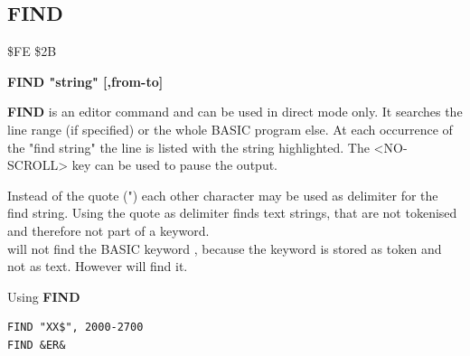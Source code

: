 \subsection{FIND}
\begin{description}[leftmargin=2cm,style=nextline]
\item [Token:] \$FE \$2B
\item [Format:] {\bf FIND "string" [,from-to]}
\item [Usage:]  {\bf FIND} is an editor command and can be used
                in direct mode only. It searches the line range
                (if specified) or the whole BASIC program else.
                At each occurrence of the "find string" the line is
                listed with the string highlighted.
                The <NO-SCROLL> key can be used to pause the output.

\item [Remarks:] Instead of the quote (") each other character may be used
                 as delimiter for the find string.
                 Using the quote as delimiter finds text strings, that are
                 not tokenised and therefore not part of a keyword. \\
                  will not find
                 the BASIC keyword , because the
                 keyword is stored as token and not as text.
                 However  will
                 find it.

\item [Example:] Using {\bf FIND}
\begin{tcolorbox}[colback=black,coltext=white]
\verbatimfont{\codefont}
\begin{verbatim}
FIND "XX$", 2000-2700
FIND &ER&
\end{verbatim}
\end{tcolorbox}
\end{description}


\newpage
